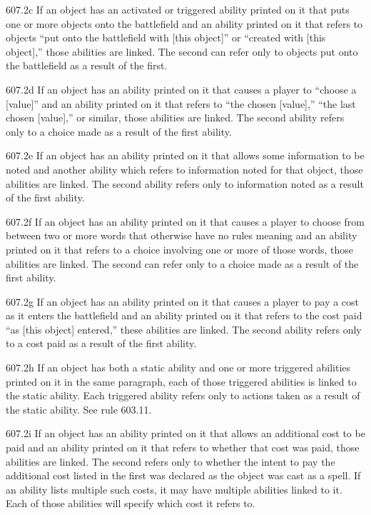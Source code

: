 607.2c If an object has an activated or triggered ability printed on it that puts one or more objects onto the battlefield and an ability printed on it that refers to objects “put onto the battlefield with [this object]” or “created with [this object],” those abilities are linked. The second can refer only to objects put onto the battlefield as a result of the first.

607.2d If an object has an ability printed on it that causes a player to “choose a [value]” and an ability printed on it that refers to “the chosen [value],” “the last chosen [value],” or similar, those abilities are linked. The second ability refers only to a choice made as a result of the first ability.

607.2e If an object has an ability printed on it that allows some information to be noted and another ability which refers to information noted for that object, those abilities are linked. The second ability refers only to information noted as a result of the first ability.

607.2f If an object has an ability printed on it that causes a player to choose from between two or more words that otherwise have no rules meaning and an ability printed on it that refers to a choice involving one or more of those words, those abilities are linked. The second can refer only to a choice made as a result of the first ability.

607.2g If an object has an ability printed on it that causes a player to pay a cost as it enters the battlefield and an ability printed on it that refers to the cost paid “as [this object] entered,” these abilities are linked. The second ability refers only to a cost paid as a result of the first ability.

607.2h If an object has both a static ability and one or more triggered abilities printed on it in the same paragraph, each of those triggered abilities is linked to the static ability. Each triggered ability refers only to actions taken as a result of the static ability. See rule 603.11.

607.2i If an object has an ability printed on it that allows an additional cost to be paid and an ability printed on it that refers to whether that cost was paid, those abilities are linked. The second refers only to whether the intent to pay the additional cost listed in the first was declared as the object was cast as a spell. If an ability lists multiple such costs, it may have multiple abilities linked to it. Each of those abilities will specify which cost it refers to.


